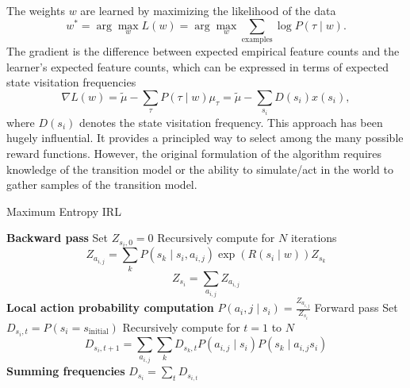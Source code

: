 \documentclass{article}
\begin{document}
The weights $w$ are learned by maximizing the likelihood of the data
    \begin{equation*}
        w^* = \arg \max_w L(w) = \arg \max_w \sum_{\textrm{examples}} \log P(\tau \mid w).
    \end{equation*}
The gradient is the difference between expected empirical feature counts and the learner's expected feature counts, which can be expressed in terms of expected state visitation frequencies     \begin{equation*}
        \nabla L(w) = \tilde{\mu} - \sum_\tau P(\tau \mid w) \mu_\tau = \tilde{\mu} - \sum_{s_i} D(s_i) x(s_i),
    \end{equation*}
    where $D(s_i)$ denotes the state visitation frequency. This approach has been hugely influential. It provides a principled way to select among the many possible reward functions. However, the original formulation of the algorithm requires knowledge of the transition model or the ability to simulate/act in the world to gather samples of the transition model.

\begin{algorithm}
\caption{Maximum Entropy IRL}\label{alg:3}
\begin{algorithmic}[1]
\Statex \textbf{Backward pass}
\State Set $Z_{s_i,0} = 0$
\State Recursively compute for $N$ iterations
\begin{equation}
    Z_{a_{i,j}} = \sum_k P(s_k \mid s_i, a_{i,j}) \exp (R(s_i \mid w)) Z_{s_k}
\end{equation}
\begin{equation}
    Z_{s_i} = \sum_{a_{i,j}} Z_{a_{i,j}}
\end{equation}
\Statex \textbf{Local action probability computation}
\State $P(a_i,j\mid s_i) = \frac{Z_{a_{i,j}}}{Z_{s_i}}$
\Statex Forward pass
\State Set $D_{{s_i},{t}} = P(s_i = s_{\textrm{initial}})$
\State Recursively compute for $t=1$ to $N$
\begin{equation}
    D_{{s_i},{t+1}} = \sum_{a_{i,j}} \sum_k D_{{s_k},{t}} P(a_{i,j}\mid s_i) P(s_k \mid a_{i,j} s_i)
\end{equation}
\Statex \textbf{Summing frequencies}
\State $D_{s_{i}} = \sum_t D_{s_{i,t}}$
\end{algorithmic}
\end{algorithm}
\end{document}
